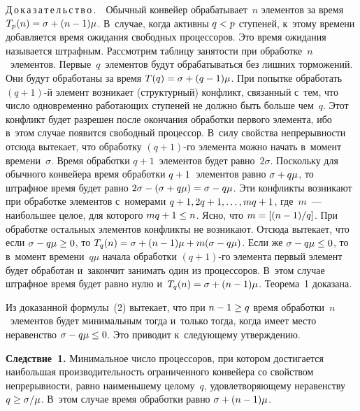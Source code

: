 \begin{multicols}{2}
  \noindent
  Д\,о\,к\,а\,з\,а\,т\,е\,л\,ь\,с\,т\,в\,о\,.\ \ Обычный конвейер 
обрабатывает~$n$ элементов за время $T_p(n)\hm= \sigma \hm+ (n\hm-
1)\mu$. В~случае, когда активны $q\hm<p$ ступеней, к~этому времени 
добавляется время ожидания свободных процессоров. Это время ожидания 
называется штрафным. Рассмотрим таблицу занятости при 
обработке~$n$~элементов. Первые~$q$~элементов будут обрабатываться 
без лишних торможений. Они будут обработаны за время $T(q)\hm= 
\sigma\hm+ (q\hm-1)\mu$. При попытке обработать $(q+1)$-й элемент 
возникает (структурный) конфликт, связанный с~тем, что чис\-ло 
одновременно работающих ступеней не должно быть больше чем~$q$. Этот 
конфликт будет разрешен после окончания обработки первого элемента, 
ибо в~этом случае появится свободный процессор. В~силу свойства 
непрерывности отсюда вытекает, что обработку $(q+1)$-го элемента можно 
начать в~момент времени~$\sigma$. Время обработки $q+1$~элементов 
будет равно~$2\sigma$. Поскольку для обычного конвейера время 
обработки $q\hm+1$~элементов равно $\sigma\hm+q\mu$, то штрафное 
время будет равно $2\sigma\hm- (\sigma \hm+ q\mu)\hm=\sigma -\hm q\mu$. 
Эти конфликты возникают при обработке элементов 
с~номерами $q\hm+1, 2q+1, \ldots , mq\hm+1$, где~$m$~--- наибольшее 
целое, для которого $mq\hm+1\hm\leq n$. Ясно, что $m\hm= \left[ ({n\hm-
1})/{q}\right]$. При обработке остальных элементов конфликты не 
возникают. Отсюда вытекает, что если $\sigma\hm- q\mu\hm\geq 0$, то 
$T_q(n)\hm=\sigma\hm+ (n\hm-1)\mu\hm+m(\sigma\hm- q\mu)$. Если же 
$\sigma\hm- q\mu\hm\leq 0$, то в~момент времени~$q\mu$ начала обработки 
$(q+1)$-го элемента первый элемент будет обработан и~закончит занимать 
один из процессоров. В~этом случае штрафное время будет равно нулю 
и~$T_q(n)\hm= \sigma\hm+ (n\hm-1)\mu$. Теорема~1 доказана.
  
  \smallskip
  
  
  Из доказанной формулы~(2) вытекает, что при $n\hm-1\hm\geq q$ время 
обработки~$n$~элементов будет минимальным тогда и~только тогда, когда 
имеет место неравенство $\sigma\hm- q\mu\hm\leq 0$. Это приводит 
к~следующему утверждению. 
  
  \smallskip
  
  \noindent
  \textbf{Следствие~1.} Минимальное число процессоров, при котором 
достигается наибольшая производительность ограниченного конвейера со 
свойством непрерывности, равно наименьшему целому~$q$, 
удовле\-тво\-ря\-юще\-му неравенству $q\hm\geq \sigma/\mu$. В~этом случае 
время обработки равно $\sigma\hm+ (n\hm-1)\mu$.
  

\end{multicols}
